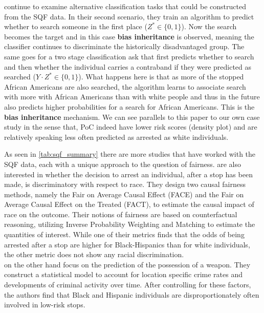\cite{rambachan2016} continue to examine alternative classification tasks that could be constructed from the SQF data. In their second scenario, they train an algorithm to predict whether to search someone in the first place ($Z^* \in \{0, 1\}$). Now the search becomes the target and in this case \textbf{bias inheritance} is observed, meaning the classifier continues to discriminate the historically disadvantaged group. The same goes for a two stage classification ask that first predicts whether to search and then whether the individual carries a contraband if they were predicted as searched ($Y \cdot Z^* \in \{0, 1\}$). What happens here is that as more of the stopped African Americans are also searched, the algorithm learns to associate search with more with African Americans than with white people and thus in the future also predicts higher probabilities for a search for African Americans. This is the \textbf{bias inheritance} mechanism.
We can see parallels to this paper to our own case study in the sense that, PoC indeed have lower risk scores (density plot) and are relatively speaking less often predicted as arrested as white individuals.

As seen in \autoref{tab:sqf_summary} there are more studies that have worked with the SQF data, each with a unique approach to the question of fairness. \cite{Khademi2019FADMELC} are also interested in whether the decision to arrest an individual, after a stop has been made, is discriminatory with respect to race. They design two causal fairness methods, namely the Fair on Average Causal Effect (FACE) and the Fair on Average Causal Effect on the Treated (FACT), to estimate the causal impact of race on the outcome. Their notions of fairness are based on counterfactual reasoning, utilizing Inverse Probability Weighting and Matching to estimate the quantities of interest.
While one of their metrics finds that the odds of being arrested after a stop are higher for Black-Hispanics than for white individuals, the other metric does not show any racial discrimination.\\
\cite{goel2016} on the other hand focus on the prediction of the possession of a weapon. They construct a statistical model to account for location specific crime rates and developments of criminal activity over time. After controlling for these factors, the authors find that Black and Hispanic individuals are disproportionately often involved in low-risk stops.




